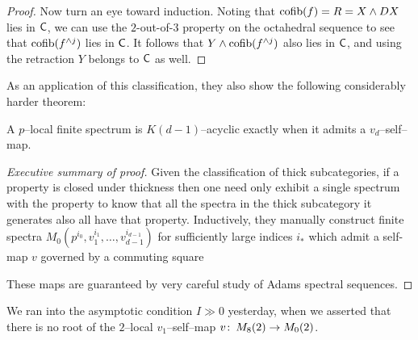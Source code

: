 \begin{proof}
Now turn an eye toward induction.  Noting that $\operatorname{cofib}(f) = R = X \wedge DX$  lies in $\mathsf{C}$, we can use the $2$-out-of-$3$ property on the octahedral sequence to see that $\operatorname{cofib}(f^{\wedge j})$ lies in $\mathsf{C}$.  It follows that $Y \wedge \operatorname{cofib}(f^{\wedge j})$ also lies in $\mathsf{C}$, and using the retraction $Y$ belongs to $\mathsf{C}$ as well.
\end{proof}

As an application of this classification, they also show the following considerably harder theorem:

\begin{theorem}
A $p$--local finite spectrum is $K(d-1)$--acyclic exactly when it admits a $v_d$--self--map.
\end{theorem}
\begin{proof}[Executive summary of proof]
Given the classification of thick subcategories, if a property is closed under thickness then one need only exhibit a single spectrum with the property to know that all the spectra in the thick subcategory it generates also all have that property.  Inductively, they manually construct finite spectra $M_0(p^{i_0}, v_1^{i_1}, \ldots, v_{d-1}^{i_{d-1}})$ for sufficiently large indices $i_*$ which admit a self-map $v$ governed by a commuting square
\begin{center}
\end{center} 
These maps are guaranteed by very careful study of Adams spectral sequences.
\end{proof}

\begin{remark}
We ran into the asymptotic condition $I \gg 0$ yesterday, when we asserted that there is no root of the $2$--local $v_1$--self--map $v\colon\thinspace M_8(2) \to M_0(2)$.
\end{remark}

